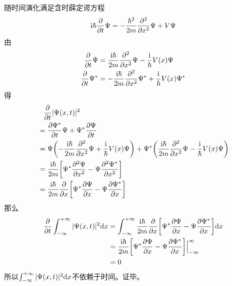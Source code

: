 {    	随时间演化满足含时薛定谔方程
    	\begin{equation}
    	\mathrm{i}\hbar \pdv{t} \Psi = -\frac{\hbar^2}{2m} \pdv[2]{x}\Psi + V\Psi
    	\end{equation}
由
    \begin{align}
    \pdv{t} \Psi &= \dfrac{\mathrm{i}\hbar}{2m} \pdv[2]{x} \Psi - \dfrac{\mathrm{i}}{\hbar} V(x) \Psi \\
    \pdv{t} \Psi^* &= -\dfrac{\mathrm{i}\hbar}{2m} \pdv[2]{x} \Psi^* + \dfrac{\mathrm{i}}{\hbar} V(x) \Psi^*
    \end{align}
得
    	\begin{align}
    	&\phantom{=}\pdv{t} |\Psi(x,t)|^2  \\
        &= \pdv{\Psi^*}{t}\Psi + \Psi^*\pdv{\Psi}{t}  \\
    	&= \Psi \qty(-\dfrac{\mathrm{i}\hbar}{2m} \pdv[2]{x} \Psi + \dfrac{\mathrm{i}}{\hbar} V(x) \Psi) + \Psi^* \qty(\dfrac{\mathrm{i}\hbar}{2m} \pdv[2]{x} \Psi - \dfrac{\mathrm{i}}{\hbar} V(x) \Psi) \\
    	&= \dfrac{\mathrm{i}\hbar}{2m} \qty[\Psi^*\pdv[2]{\Psi}{x} - \Psi\pdv[2]{\Psi^*}{x}] \\
    	&= \dfrac{\mathrm{i}\hbar}{2m} \pdv{x} \qty[\Psi^*\pdv{\Psi}{x} - \Psi\pdv{\Psi^*}{x}]
    	\end{align}
那么
    \begin{align}
    \pdv{t} \int_{- \infty}^{+ \infty} |\Psi(x,t)|^2 \mathrm{d} x &= \int_{- \infty}^{+ \infty} \dfrac{\mathrm{i}\hbar}{2m} \pdv{x} \qty[\Psi^*\pdv{\Psi}{x} - \Psi\pdv{\Psi^*}{x}] \mathrm{d} x \\
    & = \dfrac{\mathrm{i}\hbar}{2m} \qty[\Psi^*\pdv{\Psi}{x} - \Psi\pdv{\Psi^*}{x}] \Big|_{-\infty}^\infty \\
   &= 0 
    \end{align}
 所以$ \int_{- \infty}^{+ \infty} |\Psi(x,t)|^2 \mathrm{d} x  $不依赖于时间。证毕。
}



